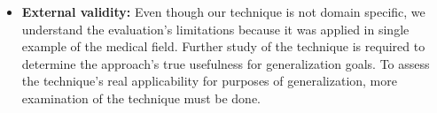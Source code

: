 \begin{itemize}
	\item \textbf{External validity:} Even though our technique is not domain specific, we understand the evaluation's limitations because it was applied in single example of the medical field. Further study of the technique is required to determine the approach's true usefulness for generalization goals. To assess the technique's real applicability for purposes of generalization, more examination of the technique must be done.
    
\end{itemize}